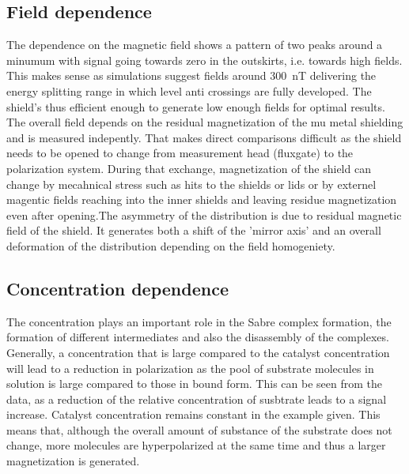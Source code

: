         \subsection{Field dependence}
        The dependence on the magnetic field shows a pattern of two peaks around a minumum with signal going towards zero in the outskirts, i.e. towards high fields. This makes sense as simulations suggest fields around \SI{300}{\nano\tesla} delivering the energy splitting range in which level anti crossings are fully developed. The shield's thus efficient enough to generate low enough fields for optimal results. The overall field depends on the residual magnetization of the mu metal shielding and is measured indepently. That makes direct comparisons difficult as the shield needs to be opened to change from measurement head (fluxgate) to the polarization system. During that exchange, magnetization of the shield can change by mecahnical stress such as hits to the shields or lids or by externel magentic fields reaching into the inner shields and leaving residue magnetization even after opening.The asymmetry of the distribution is due to residual magnetic field of the shield. It generates both a shift of the 'mirror axis' and an overall deformation of the distribution depending on the field homogeniety.
        \subsection{Concentration dependence}
            The concentration plays an important role in the Sabre complex formation, the formation of different intermediates and also the disassembly of the complexes. Generally, a concentration that is large compared to the catalyst concentration will lead to a reduction in polarization as the pool of substrate molecules in solution is large compared to those in bound form. This can be seen from the data, as a reduction of the relative concentration of susbtrate leads to a signal increase. Catalyst concentration remains constant in the example given. This means that, although the overall amount of substance of the substrate does not change, more molecules are hyperpolarized at the same time and thus a larger magnetization is generated.
